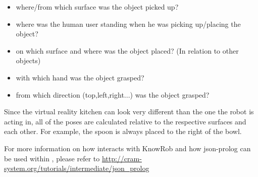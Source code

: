 \begin{itemize}
	\item where/from which surface was the object picked up?
	\item where was the human user standing when he was picking up/placing the object?
	\item on which surface and where was the object placed? (In relation to other objects)
	\item with which hand was the object grasped?
	\item from which direction (top,left,right...) was the object grasped?
\end{itemize}

Since the virtual reality kitchen can look very different than the one the robot is acting in, all of the poses are calculated relative to the respective surfaces and each other. For example, the spoon is always placed to the right of the bowl. 

For more information on how \cram interacts with KnowRob and how json-prolog can be used within \cram, please refer to \url{http://cram-system.org/tutorials/intermediate/json_prolog}





